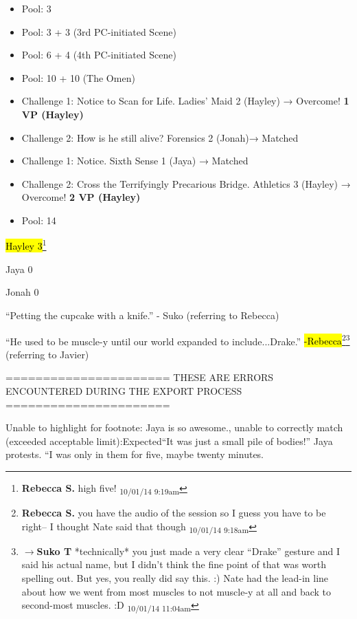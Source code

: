 \begin{itemize}
\item Pool: 3
\item Pool: 3 + 3 (3rd PC-initiated Scene)
\item Pool: 6 + 4 (4th PC-initiated Scene)
\item Pool: 10 + 10 (The Omen)
\item Challenge 1: Notice to Scan for Life.  Ladies' Maid 2 (Hayley) → Overcome! \textbf{1 VP (Hayley)}
\item Challenge 2:  How is he still alive?  Forensics 2 (Jonah)→ Matched
\item Challenge 1: Notice.  Sixth Sense 1 (Jaya) → Matched 
\item Challenge 2: Cross the Terrifyingly Precarious Bridge.  Athletics 3 (Hayley) → Overcome! \textbf{2 VP (Hayley)}
\item Pool: 14
\end{itemize}





\hl{Hayley 3}\footnote{\textbf{Rebecca S. }high five! \textsubscript{10/01/14 9:19am}}

Jaya 0

Jonah 0





``Petting the cupcake with a knife.'' - Suko (referring to Rebecca)



``He used to be muscle-y until our world expanded to include...Drake.'' \hl{-Rebecca}\footnote{\textbf{Rebecca S. }you have the audio of the session so I guess you have to be right-- I thought Nate said that though \textsubscript{10/01/14 9:18am}}\footnote{$\rightarrow$\textbf{Suko T }*technically* you just made a very clear ``Drake'' gesture and I said his actual name, but I didn't think the fine point of that was worth spelling out.  But yes, you really did say this. :) Nate had the lead-in line about how we went from most muscles to not muscle-y at all and back to second-most muscles. :D \textsubscript{10/01/14 11:04am}} (referring to Javier)


\iffalse

======================
THESE ARE ERRORS ENCOUNTERED DURING THE EXPORT PROCESS
======================

	Unable to highlight for footnote: Jaya is so awesome., unable to correctly match (exceeded acceptable limit):Expected“It was just a small pile of bodies!” Jaya protests.  “I was only in them for five, maybe twenty minutes.


